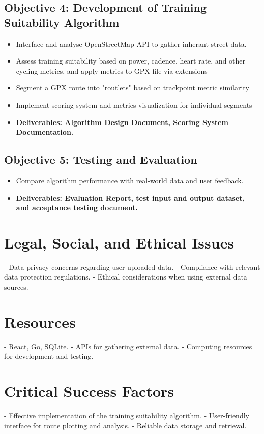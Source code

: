 \documentclass{article}
\begin{document}
\subsection{Objective 4: Development of Training Suitability Algorithm}
\begin{itemize}
\item Interface and analyse OpenStreetMap API to gather inherant street data.
\item Assess training suitability based on power, cadence, heart rate, and other cycling metrics, and apply metrics to GPX file via extensions
\item Segment a GPX route into "routlets" based on trackpoint metric similarity
\item Implement scoring system and metrics visualization for individual segments
\item \textbf{Deliverables: Algorithm Design Document, Scoring System Documentation.}
\end{itemize}

\subsection{Objective 5: Testing and Evaluation}
\begin{itemize}
\item Compare algorithm performance with real-world data and user feedback.
\item \textbf{Deliverables: Evaluation Report, test input and output dataset, and acceptance testing document.}
\end{itemize}


\section{Legal, Social, and Ethical Issues}
- Data privacy concerns regarding user-uploaded data.
- Compliance with relevant data protection regulations.
- Ethical considerations when using external data sources.

\section{Resources}
- React, Go, SQLite.
- APIs for gathering external data.
- Computing resources for development and testing.

\section{Critical Success Factors}
- Effective implementation of the training suitability algorithm.
- User-friendly interface for route plotting and analysis.
- Reliable data storage and retrieval.
\end{document}
